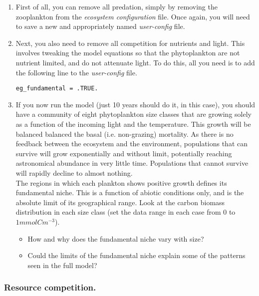 \documentclass[11pt,fleqn]{book} %
\begin{document}
\begin{enumerate}[noitemsep]
\vspace{1mm}
\item First of all, you can remove all predation, simply by removing the zooplankton from the \textit{ecosystem configuration} file. Once again, you will need to save a new and appropriately named \textit{user-config} file.
\vspace{1mm}
\item Next, you also need to remove all competition for nutrients and light. This involves tweaking the model equations so that the phytoplankton are not nutrient limited, and do not attenuate light. To do this, all you need is to add the following line to the \textit{user-config} file.
\small\begin{verbatim}
eg_fundamental = .TRUE.
\end{verbatim}\normalsize
\vspace{1mm}
\item If you now run the model (just 10 years should do it, in this case), you should have a community of eight phytoplankton size classes that are growing solely as a function of the incoming light and the temperature. This growth will be balanced balanced the basal (i.e. non-grazing) mortality. As there is no feedback between the ecosystem and the environment, populations that can survive will grow exponentially and without limit, potentially reaching astronomical abundance in very little time. Populations that cannot survive will rapidly decline to almost nothing.
\\The regions in which each plankton shows positive growth defines its fundamental niche. This is a function of abiotic conditions only, and is the absolute limit of its geographical range. Look at the carbon biomass distribution in each size class (set the data range in each case from \(0\) to \(1mmolCm^{-3}\)).
\begin{itemize}
\item How and why does the fundamental niche vary with size?
\item Could the limits of the fundamental niche explain some of the patterns seen in the full model?
\end{itemize}

\end{enumerate}
\vspace{2mm}


\subsubsection*{Resource competition.}
\end{document}
